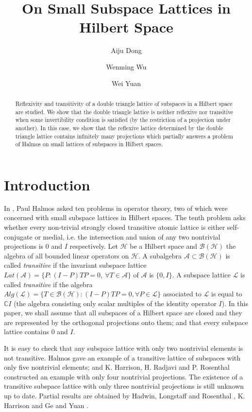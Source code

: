 \documentclass{jaums}
\title{On Small Subspace Lattices in Hilbert Space}
\author{Aiju Dong}
\author{Wenming Wu}
\author{Wei Yuan}
\theoremstyle{thmit} %
\theoremstyle{thmrm} %
\begin{document}
\maketitle

\begin{abstract}
Reflexivity and transitivity of a double triangle lattice of subspaces in a
Hilbert space are studied. We show that the double triangle lattice is neither
reflexive nor transitive when some invertibility condition is satisfied (by the
restriction of a projection under another). In this case, we show that the
reflexive lattice determined by the double triangle lattice contains infinitely
many projections which partially answers a problem of Halmos on small lattices
of subspaces in Hilbert spaces.
\end{abstract}

\section{Introduction}

In {\cite{[Hal]}}, Paul Halmos asked ten problems in operator theory, two of
which were concerned with small subspace lattices in Hilbert spaces. The tenth
problem asks whether every non-trivial strongly closed transitive atomic lattice
is either self-conjugate or medial, i.e. the intersection and union of any two
nontrivial projections is $0$ and $I$ respectively. Let $\mathcal H$ be a
Hilbert space and
$\mathcal B(\mathcal H)$ the algebra of all bounded linear operators on
$\mathcal H$. A subalgebra $\mathcal{A}\subset\mathcal{B}(\mathcal{H})$ is
called {\sl transitive} if the invariant subspace lattice 
$Lat(\mathcal{A})=\{P:(I-P)TP=0,\ \forall T\in\mathcal{A}\}$ of $\mathcal{A}$ 
is
$\{0,I\}$. A subspace lattice $\mathcal{L}$ is called {\sl transitive} if the
algebra
$Alg(\mathcal{L})=\{T\in\mathcal{B}(\mathcal{H}):(I-P)TP=0,\forall
P\in\mathcal{L}\}$ associated to $\mathcal{L}$ is equal to $\mathbb{C}I$ (the
algebra
consisting only scalar multiples of the identity operator $I$). In this paper,
we shall assume that all subspaces of a Hilbert space are closed and they are
represented by the orthogonal projections onto them; and that every subspace
lattice contains 0 and $I$.

It is easy to check that any subspace lattice with only two nontrivial elements
is not transitive. Halmos {\cite{[Hal]}} gave an example of a transitive lattice
of subspaces with only five nontrivial elements; and K. Harrison, H. Radjavi
and P. Rosenthal {\cite{[HRR]}} constructed an example with only four nontrivial
projections. The existence of a transitive subspace lattice with only three
nontrivial projections is still unknown up to date.  Partial results are
obtained by Hadwin, Longstaff and Rosenthal {\cite{[HLP]}}, K. Harrison
{\cite{[Har]}} and Ge and Yuan {\cite{[GY],[GY2]}}.
\end{document}
